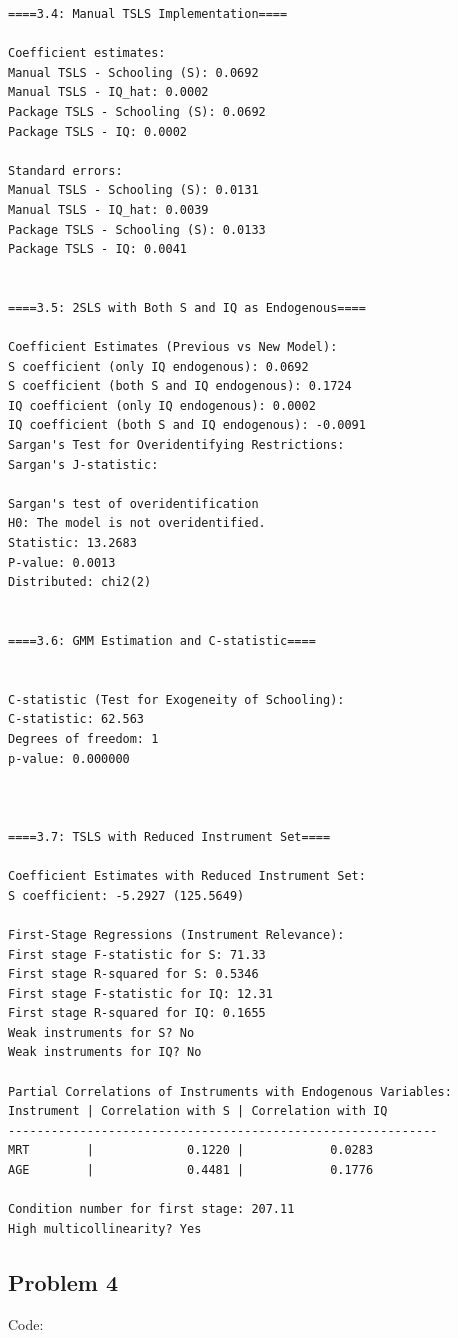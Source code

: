 \documentclass[10pt]{article}
\begin{document}
\begin{verbatim}
====3.4: Manual TSLS Implementation====

Coefficient estimates:
Manual TSLS - Schooling (S): 0.0692
Manual TSLS - IQ_hat: 0.0002
Package TSLS - Schooling (S): 0.0692
Package TSLS - IQ: 0.0002

Standard errors:
Manual TSLS - Schooling (S): 0.0131
Manual TSLS - IQ_hat: 0.0039
Package TSLS - Schooling (S): 0.0133
Package TSLS - IQ: 0.0041


====3.5: 2SLS with Both S and IQ as Endogenous====

Coefficient Estimates (Previous vs New Model):
S coefficient (only IQ endogenous): 0.0692
S coefficient (both S and IQ endogenous): 0.1724
IQ coefficient (only IQ endogenous): 0.0002
IQ coefficient (both S and IQ endogenous): -0.0091
Sargan's Test for Overidentifying Restrictions:
Sargan's J-statistic: 

Sargan's test of overidentification
H0: The model is not overidentified.
Statistic: 13.2683
P-value: 0.0013
Distributed: chi2(2)


====3.6: GMM Estimation and C-statistic====


C-statistic (Test for Exogeneity of Schooling):
C-statistic: 62.563
Degrees of freedom: 1
p-value: 0.000000



====3.7: TSLS with Reduced Instrument Set====

Coefficient Estimates with Reduced Instrument Set:
S coefficient: -5.2927 (125.5649)

First-Stage Regressions (Instrument Relevance):
First stage F-statistic for S: 71.33
First stage R-squared for S: 0.5346
First stage F-statistic for IQ: 12.31
First stage R-squared for IQ: 0.1655
Weak instruments for S? No
Weak instruments for IQ? No

Partial Correlations of Instruments with Endogenous Variables:
Instrument | Correlation with S | Correlation with IQ
------------------------------------------------------------
MRT        |             0.1220 |            0.0283
AGE        |             0.4481 |            0.1776

Condition number for first stage: 207.11
High multicollinearity? Yes
\end{verbatim}

\newpage
\subsection*{Problem 4}\label{code:p4}
Code:
\end{document}
